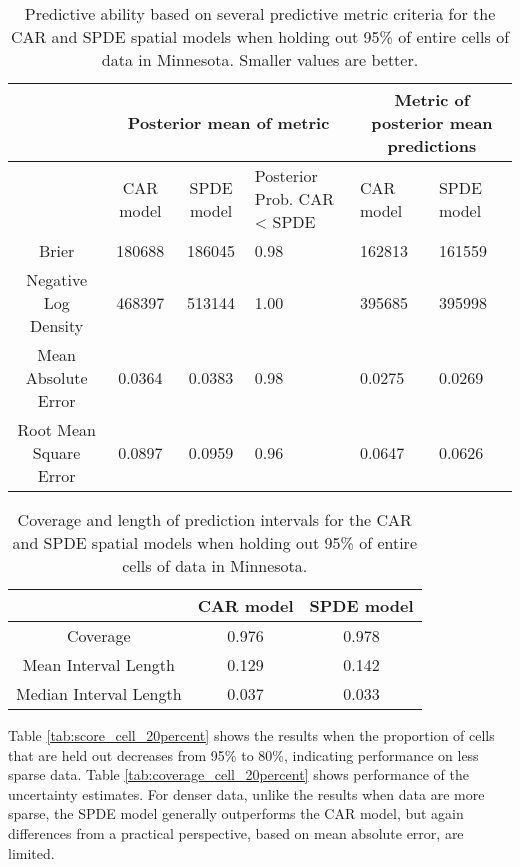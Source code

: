 \documentclass[12pt]{article}\usepackage[]{graphicx}\usepackage[]{color}
\providecommand{\tabularnewline}{\\}
\begin{document}
\begin{table}
\caption{Predictive ability based on several predictive metric criteria for
the CAR and SPDE spatial models when holding out 95\% of entire cells
of data in Minnesota. Smaller values are better.}


\begin{tabular}{|c|c|c|>{\centering}p{3cm}|>{\centering}p{2.5cm}|>{\centering}p{2.5cm}|}
\hline 
 &
\multicolumn{3}{c|}{{\small{Posterior mean of metric}}} &
\multicolumn{2}{c|}{{\small{Metric of posterior mean predictions}}}\tabularnewline
\hline 
\hline 
 &
{\small{CAR model}} &
{\small{SPDE model}} &
{\small{Posterior Prob. CAR < SPDE}} &
{\small{CAR model}} &
{\small{SPDE model}}\tabularnewline
\hline 
{\small{Brier}} &
{\small{180688}} &
{\small{186045}} &
{\small{0.98}} &
{\small{162813}} &
{\small{161559}}\tabularnewline
\hline 
{\small{Negative Log Density}} &
{\small{468397}} &
{\small{513144}} &
{\small{1.00}} &
{\small{395685}} &
{\small{395998}}\tabularnewline
\hline 
{\small{Mean Absolute Error}} &
{\small{0.0364}} &
{\small{0.0383}} &
{\small{0.98}} &
{\small{0.0275}} &
{\small{0.0269}}\tabularnewline
\hline 
{\small{Root Mean Square Error}} &
{\small{0.0897}} &
{\small{0.0959}} &
{\small{0.96}} &
{\small{0.0647}} &
{\small{0.0626}}\tabularnewline
\hline 
\end{tabular}

\label{tab:score_cell_fivepercent}
\end{table}


\begin{table}
\caption{Coverage and length of prediction intervals for the CAR and SPDE spatial
models when holding out 95\% of entire cells of data in Minnesota. }


\begin{tabular}{|c|c|c|}
\hline 
 &
{\small{CAR model}} &
{\small{SPDE model}}\tabularnewline
\hline 
{\small{Coverage}} &
{\small{0.976}} &
{\small{0.978}}\tabularnewline
\hline 
{\small{Mean Interval Length}} &
{\small{0.129}} &
{\small{0.142}}\tabularnewline
\hline 
{\small{Median Interval Length}} &
{\small{0.037}} &
{\small{0.033}}\tabularnewline
\hline 
\end{tabular}

\label{tab:coverage_cell_fivepercent}
\end{table}




Table \ref{tab:score_cell_20percent} shows the results when the proportion
of cells that are held out decreases from 95\% to 80\%, indicating
performance on less sparse data. Table \ref{tab:coverage_cell_20percent}
shows performance of the uncertainty estimates. For denser data, unlike
the results when data are more sparse, the SPDE model generally outperforms
the CAR model, but again differences from a practical perspective,
based on mean absolute error, are limited.
\end{document}
